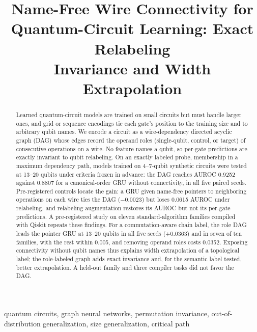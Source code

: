 \documentclass[conference,a4paper]{IEEEtran}
\begin{document}

\title{Name-Free Wire Connectivity for\\ Quantum-Circuit Learning: Exact Relabeling\\ Invariance and Width Extrapolation}

\author{
}

\maketitle

\begin{abstract}
Learned quantum-circuit models are trained on small circuits but must handle larger ones, and grid or sequence encodings tie each gate's position to the training size and to arbitrary qubit names. We encode a circuit as a wire-dependency directed acyclic graph (DAG) whose edges record the operand roles (single-qubit, control, or target) of consecutive operations on a wire. No feature names a qubit, so per-gate predictions are exactly invariant to qubit relabeling. On an exactly labeled probe, membership in a maximum dependency path, models trained on 4--7-qubit synthetic circuits were tested at 13--20 qubits under criteria frozen in advance: the DAG reaches AUROC 0.9252 against 0.8807 for a canonical-order GRU without connectivity, in all five paired seeds. Pre-registered controls locate the gain: a GRU given name-free pointers to neighboring operations on each wire ties the DAG ($-0.0023$) but loses 0.0615 AUROC under relabeling, and relabeling augmentation restores its AUROC but not its per-gate predictions. A pre-registered study on eleven standard-algorithm families compiled with Qiskit repeats these findings. For a commutation-aware chain label, the role DAG leads the pointer GRU at 13--20 qubits in all five seeds ($+0.0363$) and in seven of ten families, with the rest within 0.005, and removing operand roles costs 0.0352. Exposing connectivity without qubit names thus explains width extrapolation of a topological label; the role-labeled graph adds exact invariance and, for the semantic label tested, better extrapolation. A held-out family and three compiler tasks did not favor the DAG.
\end{abstract}

\begin{IEEEkeywords}
quantum circuits, graph neural networks, permutation invariance, out-of-distribution generalization, size generalization, critical path
\end{IEEEkeywords}
\end{document}
